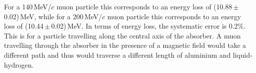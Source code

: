 For a 140\,MeV/$c$ muon particle this corresponds to an energy loss of (10.88\,$\mathrm{\pm}$\,0.02)\,MeV, while for a 200\,MeV/$c$ muon particle this corresponds to an energy loss of (10.44\,$\mathrm{\pm}$\,0.02)\,MeV. In terms of energy loss, the systematic error is 0.2\%. This is for a particle travelling along the central axis of the absorber. A muon travelling through the absorber in the presence of a magnetic field would take a different path and thus would traverse a different length of aluminium and liquid-hydrogen.
 




